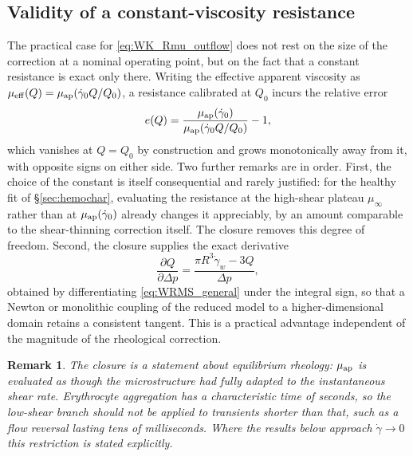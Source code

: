 \documentclass[lineno]{jfm}
\newtheorem{remark}{Remark}
\begin{document}
\subsection{Validity of a constant-viscosity resistance}
\label{sec:calibration-point}

The practical case for \eqref{eq:WK_Rmu_outflow} does not rest on the size of the
correction at a nominal operating point, but on the fact that a constant
resistance is exact only there. Writing the effective apparent viscosity as
$\mu_{\rm eff}(Q)=\mu_{\rm ap}(\dot{\gamma}_{0}Q/Q_{0})$, a resistance calibrated
at $Q_{0}$ incurs the relative error
\begin{equation}
e(Q)=\frac{\mu_{\rm ap}(\dot{\gamma}_{0})}{\mu_{\rm ap}(\dot{\gamma}_{0}Q/Q_{0})}-1,
\label{eq:calibration-error}
\end{equation}
which vanishes at $Q=Q_{0}$ by construction and grows monotonically away from it,
with opposite signs on either side. Two further remarks are in order. First, the
choice of the constant is itself consequential and rarely justified: for the
healthy fit of \S\ref{sec:hemochar}, evaluating the resistance at the high-shear
plateau $\mu_{\infty}$ rather than at $\mu_{\rm ap}(\dot{\gamma}_{0})$ already
changes it appreciably, by an amount comparable to the shear-thinning correction
itself. The closure removes this degree of freedom. Second, the closure supplies
the exact derivative
\begin{equation}
\frac{\partial Q}{\partial\Delta p}
=\frac{\pi R^{3}\dot{\gamma}_{w}-3Q}{\Delta p},
\label{eq:exact-derivative}
\end{equation}
obtained by differentiating \eqref{eq:WRMS_general} under the integral sign, so
that a Newton or monolithic coupling of the reduced model to a higher-dimensional
domain retains a consistent tangent. This is a practical advantage independent of
the magnitude of the rheological correction.

\begin{remark}
The closure is a statement about equilibrium rheology: $\mu_{\rm ap}$ is
evaluated as though the microstructure had fully adapted to the instantaneous
shear rate. Erythrocyte aggregation has a characteristic time of seconds, so the
low-shear branch should not be applied to transients shorter than that, such as a
flow reversal lasting tens of milliseconds. Where the results below approach
$\dot{\gamma}\to 0$ this restriction is stated explicitly.
\end{remark}
\end{document}
